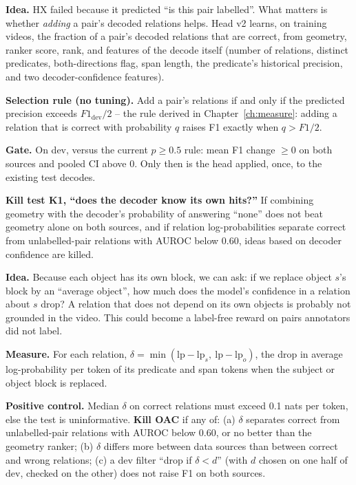 \documentclass[11pt,openany]{book}
\begin{document}
\begin{pendingbox}
\textbf{Idea.} HX failed because it predicted ``is this pair labelled''. What matters is whether \emph{adding} a pair's decoded
relations helps. Head v2 learns, on training videos, the fraction of a pair's decoded relations that are correct, from geometry,
ranker score, rank, and features of the decode itself (number of relations, distinct predicates, both-directions flag, span length,
the predicate's historical precision, and two decoder-confidence features).

\textbf{Selection rule (no tuning).} Add a pair's relations if and only if the predicted precision exceeds $F1_{\text{dev}}/2$ -- the
rule derived in Chapter~\ref{ch:measure}: adding a relation that is correct with probability $q$ raises F1 exactly when $q > F1/2$.

\textbf{Gate.} On dev, versus the current $p\ge 0.5$ rule: mean F1 change $\ge 0$ on both sources and pooled CI above 0. Only then is
the head applied, once, to the existing test decodes.

\textbf{Kill test K1, ``does the decoder know its own hits?''} If combining geometry with the decoder's probability of answering
``none'' does not beat geometry alone on both sources, and if relation log-probabilities separate correct from unlabelled-pair
relations with AUROC below 0.60, ideas based on decoder confidence are killed.
\end{pendingbox}

\begin{pendingbox}
\textbf{Idea.} Because each object has its own block, we can ask: if we replace object $s$'s block by an ``average object'', how much
does the model's confidence in a relation about $s$ drop? A relation that does not depend on its own objects is probably not
grounded in the video. This could become a label-free reward on pairs annotators did not label.

\textbf{Measure.} For each relation, $\delta = \min(\text{lp}-\text{lp}_s,\ \text{lp}-\text{lp}_o)$, the drop in average log-probability
per token of its predicate and span tokens when the subject or object block is replaced.

\textbf{Positive control.} Median $\delta$ on correct relations must exceed 0.1 nats per token, else the test is uninformative.
\textbf{Kill OAC} if any of: (a) $\delta$ separates correct from unlabelled-pair relations with AUROC below 0.60, or no better than the
geometry ranker; (b) $\delta$ differs more between data sources than between correct and wrong relations; (c) a dev filter
``drop if $\delta < d$'' (with $d$ chosen on one half of dev, checked on the other) does not raise F1 on both sources.
\end{pendingbox}
\end{document}

